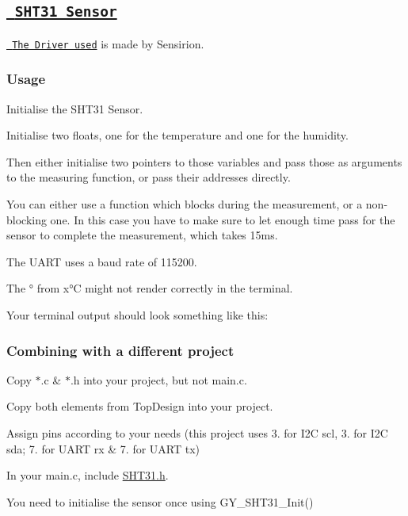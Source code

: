 \subsection*{\href{https://www.sensirion.com/en/environmental-sensors/humidity-sensors/digital-humidity-sensors-for-various-applications/}{\texttt{ S\+H\+T31 Sensor}}}

\href{https://github.com/Sensirion/embedded-sht}{\texttt{ The Driver used}} is made by Sensirion.

\subsubsection*{Usage}

Initialise the S\+H\+T31 Sensor.

Initialise two floats, one for the temperature and one for the humidity.

Then either initialise two pointers to those variables and pass those as arguments to the measuring function, or pass their addresses directly.

You can either use a function which blocks during the measurement, or a non-\/blocking one. In this case you have to make sure to let enough time pass for the sensor to complete the measurement, which takes 15ms.

The U\+A\+RT uses a baud rate of 115200.

The ° from x°C might not render correctly in the terminal.

Your terminal output should look something like this\+: 
\begin{DoxyCode}{0}
\end{DoxyCode}


\subsubsection*{Combining with a different project}


\begin{DoxyItemize}
\item Copy $\ast$.c \& $\ast$.h into your project, but not main.\+c.
\item Copy both elements from Top\+Design into your project.
\item Assign pins according to your needs (this project uses 3. for I2C scl, 3. for I2C sda; 7. for U\+A\+RT rx \& 7. for U\+A\+RT tx)
\item In your main.\+c, include \mbox{\hyperlink{_s_h_t31_8h_source}{S\+H\+T31.\+h}}.
\item You need to initialise the sensor once using {\ttfamily G\+Y\+\_\+\+S\+H\+T31\+\_\+\+Init()}
\end{DoxyItemize}

